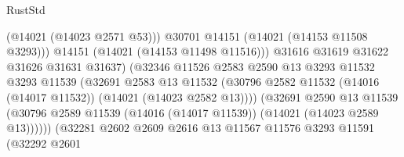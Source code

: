 \begin{lexlean}{RustStd}
\begin{coremodule}
                                                (@14021 (@14023 @2571 @53)))
                                              @30701
                                              @14151
                                              (@14021 (@14153 @11508 @3293)))
                                            @14151
                                            (@14021 (@14153 @11498 @11516)))
                                          @31616
                                          @31619
                                          @31622
                                          @31626
                                          @31631
                                          @31637)
                                        (@32346
                                          @11526
                                          @2583
                                          @2590
                                          @13
                                          @3293
                                          @11532
                                          @3293
                                          @11539
                                          (@32691
                                            @2583
                                            @13
                                            @11532
                                            (@30796
                                              @2582
                                              @11532
                                              (@14016 (@14017 @11532))
                                              (@14021 (@14023 @2582 @13))))
                                          (@32691
                                            @2590
                                            @13
                                            @11539
                                            (@30796
                                              @2589
                                              @11539
                                              (@14016 (@14017 @11539))
                                              (@14021 (@14023 @2589 @13))))))
                                      (@32281
                                        @2602
                                        @2609
                                        @2616
                                        @13
                                        @11567
                                        @11576
                                        @3293
                                        @11591
                                        (@32292
                                          @2601

\end{coremodule}
\end{lexlean}
